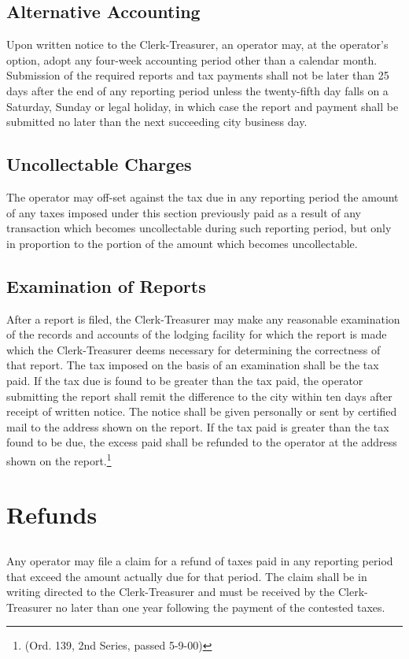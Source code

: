 \subsection{Alternative Accounting}
Upon written notice to the Clerk-Treasurer, an operator may, at the operator’s option, adopt any four-week accounting period other than a calendar month.  Submission of the required reports and tax payments shall not be later than 25 days after the end of any reporting period unless the twenty-fifth day falls on a Saturday, Sunday or legal holiday, in which case the report and payment shall be submitted no later than the next succeeding city business day.
\subsection{Uncollectable Charges}
The operator may off-set against the tax due in any reporting period the amount of any taxes imposed under this section previously paid as a result of any transaction which becomes uncollectable during such reporting period, but only in proportion to the portion of the amount which becomes uncollectable.
\subsection{Examination of Reports}
After a report is filed, the Clerk-Treasurer may make any reasonable examination of the records and accounts of the lodging facility for which the report is made which the Clerk-Treasurer deems necessary for determining the correctness of that report. The tax imposed on the basis of an examination shall be the tax paid. If the tax due is found to be greater than the tax paid, the operator submitting the report shall remit the difference to the city within ten days after receipt of written notice. The notice shall be given personally or sent by certified mail to the address shown on the report. If the tax paid is greater than the tax found to be due, the excess paid shall be refunded to the operator at the address shown on the report.\footnote{(Ord. 139, 2nd Series, passed 5-9-00)}

\section{Refunds}
\subsection{}
Any operator may file a claim for a refund of taxes paid in any reporting period that exceed the amount actually due for that period. The claim shall be in writing directed to the Clerk-Treasurer and must be received by the Clerk-Treasurer no later than one year following the payment of the contested taxes.
